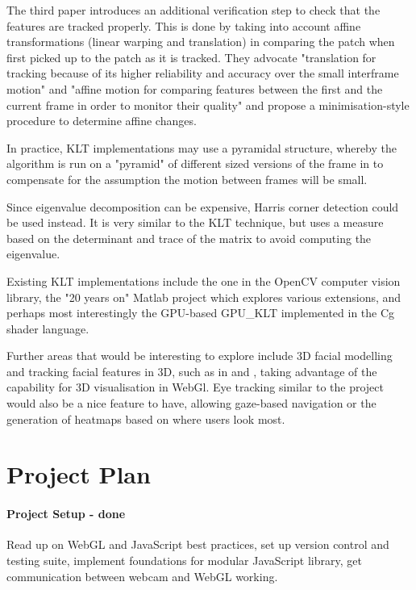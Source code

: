 \documentclass[a4paper]{article}
\begin{document}
The third paper introduces an additional verification step to check that the features are tracked properly. This is done by taking into account affine transformations (linear warping and translation) in comparing the patch when first picked up to the patch as it is tracked. They advocate "translation for tracking because of its higher reliability and accuracy over the small interframe motion" and "affine motion for comparing features between the first and the current frame in order to monitor their quality" and propose a minimisation-style procedure to determine affine changes.

In practice, KLT implementations may use a pyramidal structure, whereby the algorithm is run on a "pyramid" of different sized versions of the frame in to compensate for the assumption the motion between frames will be small.

Since eigenvalue decomposition can be expensive, Harris corner detection \cite{HarrisStephens88} could be used instead. It is very similar to the KLT technique, but uses a measure based on the determinant and trace of the matrix to avoid computing the eigenvalue.

Existing KLT implementations include the one in the OpenCV computer vision library, the "20 years on" \cite{Baker11} Matlab project which explores various extensions, and perhaps most interestingly the GPU-based GPU\_KLT \cite{Sinha} implemented in the Cg shader language.

Further areas that would be interesting to explore include 3D facial modelling and tracking facial features in 3D, such as in \cite{Cohen00} and \cite{Caunce09}, taking advantage of the capability for 3D visualisation in WebGl. Eye tracking similar to the \cite{Opengazer} project would also be a nice feature to have, allowing gaze-based navigation or the generation of heatmaps based on where users look most.

\section{Project Plan}

\paragraph{Project Setup - done}
Read up on WebGL and JavaScript best practices, set up version control and testing suite, implement foundations for modular JavaScript library, get communication between webcam and WebGL working.
\end{document}
